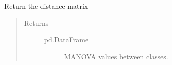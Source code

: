 \documentclass[letterpaper,10pt,english]{sphinxmanual}
\begin{document}
\begin{fulllineitems}
\begin{fulllineitems}
\label{\detokenize{index:methylnet.interpretation_classes.DistanceMatrixCompute.return_p_values}}
Return the distance matrix
\begin{quote}\begin{description}
\item[{Returns}] \leavevmode\begin{description}
\item[{pd.DataFrame}] \leavevmode
MANOVA values between classes.

\end{description}

\end{description}\end{quote}

\end{fulllineitems}


\end{fulllineitems}

\end{document}
